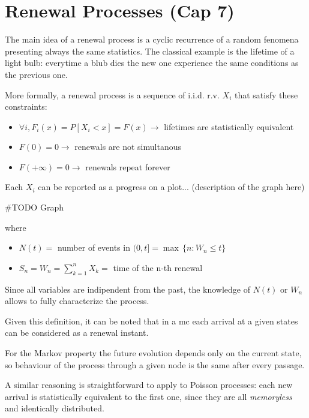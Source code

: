 \chapter{Renewal Processes (Cap 7)}
The main idea of a renewal process is a cyclic recurrence of a random fenomena presenting always the same statistics.
The classical example is the lifetime of a light bulb: everytime a blub dies the new one experience the same conditions as the previous one.

\begin{definition}
	More formally, a renewal process is a sequence of i.i.d. r.v. $X_i$ that satisfy these constraints:

	\begin{itemize}
		\item $ \forall i, F_i(x) = P[X_i < x] = F(x) \rightarrow $ lifetimes are statistically equivalent
		\item $ F(0) = 0 \rightarrow $ renewals are not simultanous
		\item $ F(+\infty) = 0 \rightarrow $ renewals repeat forever
	\end{itemize}

\end{definition}

Each $X_i$ can be reported as a progress on a plot... (description of the graph here)

\#TODO Graph

where
\begin{itemize}
	\item $ N(t) = $ number of events in $(0, t] = \max\,\{n : W_n \le t \}$
	\item $ S_n = W_n = \sum\limits_{k=1}^n X_k =$ time of the n-th renewal
\end{itemize}

Since all variables are indipendent from the past, the knowledge of $N(t)$ or $W_n$ allows to fully characterize the process.

\begin{remark}
	Given this definition, it can be noted that in a \gls{mc} each arrival at a given states can be considered as a renewal instant.

	For the Markov property the future evolution depends only on the current state, so behaviour of the process through a given node is the same after every passage.
\end{remark}

\begin{remark}
	A similar reasoning is straightforward to apply to Poisson processes: each new arrival is statistically equivalent to the first one, since they are all \emph{memoryless} and identically distributed.
\end{remark}

